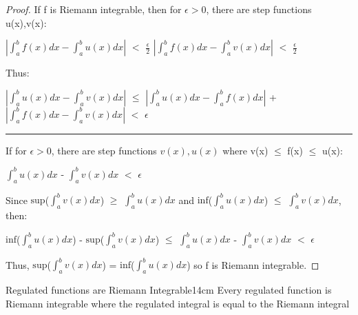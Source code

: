     \begin{proof}
        If f is Riemann integrable, then for $\epsilon > 0$,
        there are step functions u(x),v(x):

        \hspace{0.5cm}
        $|\int_a^b f(x) dx - \int_a^b u(x) dx|$ $<$ $\frac{\epsilon}{2}$
        \hspace{1cm}
        $|\int_a^b f(x) dx - \int_a^b v(x) dx|$ $<$ $\frac{\epsilon}{2}$

        Thus:

        \hspace{0.5cm}
        $|\int_a^b u(x) dx - \int_a^b v(x) dx|$
        $\leq$ $|\int_a^b u(x) dx - \int_a^b f(x) dx|$
                + $|\int_a^b f(x) dx - \int_a^b v(x) dx|$
        $<$ $\epsilon$

        \rule[0.1cm]{15.2cm}{0.01cm}

        If for $\epsilon > 0$, there are step functions $v(x),u(x)$
        where v(x) $\leq$ f(x) $\leq$ u(x):

        \hspace{0.5cm}
        $\int_a^b u(x) dx$ - $\int_a^b v(x) dx$ $<$ $\epsilon$

        Since
        $\text{sup}$($\int_a^b v(x) dx$)
        $\geq$ $\int_a^b u(x) dx$
        and
        $\text{inf}$($\int_a^b u(x) dx$)
        $\leq$ $\int_a^b v(x) dx$, then:

        \hspace{0.5cm}
        $\text{inf}$($\int_a^b u(x) dx$) - $\text{sup}$($\int_a^b v(x) dx$)
        $\leq$ $\int_a^b u(x) dx$ - $\int_a^b v(x) dx$ $<$ $\epsilon$

        Thus, $\text{sup}$($\int_a^b v(x) dx$)
        = $\text{inf}$($\int_a^b u(x) dx$)
        so f is Riemann integrable.
    \end{proof}

    \newpage



    \begin{wtheorem}{Regulated functions are Riemann Integrable}{14cm}
        Every regulated function is Riemann integrable where
        the regulated integral is equal to the Riemann integral
    \end{wtheorem}

